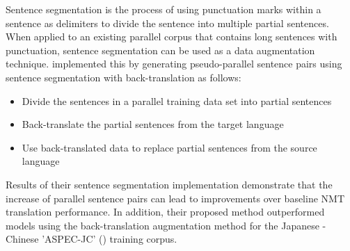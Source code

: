 Sentence segmentation is the process of using punctuation marks within a sentence as delimiters to divide the sentence into multiple partial sentences. When applied to an existing parallel corpus that contains long sentences with punctuation, sentence segmentation can be used as a data augmentation technique. \cite{zhang_corpus_2019} implemented this by generating pseudo-parallel sentence pairs using sentence segmentation with back-translation as follows:
\begin{itemize}
    \item Divide the sentences in a parallel training data set into partial sentences
    \item Back-translate the partial sentences from the target language
    \item Use back-translated data to replace partial sentences from the source language
\end{itemize}

Results of their sentence segmentation implementation demonstrate that the increase of parallel sentence pairs can lead to improvements over baseline \acrshort{NMT} translation performance. In addition, their proposed method outperformed models using the back-translation augmentation method for the Japanese - Chinese 'ASPEC-JC' (\cite{NAKAZAWA16.621}) training corpus.







